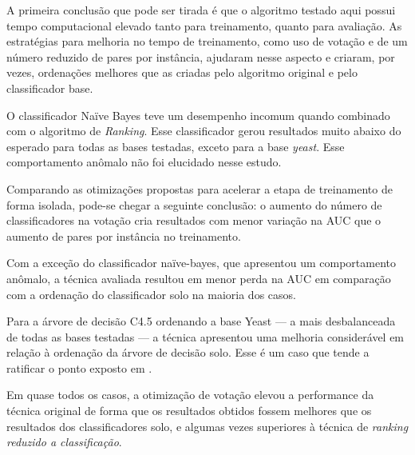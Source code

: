A primeira conclusão que pode ser tirada é que o algoritmo testado aqui possui tempo computacional elevado tanto para treinamento, quanto para avaliação. As estratégias para melhoria no tempo de treinamento, como uso de votação e de um número reduzido de pares por instância, ajudaram nesse aspecto e criaram, por vezes, ordenações melhores que as criadas pelo algoritmo original e pelo classificador base.

O classificador Naïve Bayes teve um desempenho incomum quando combinado com o algoritmo de \emph{Ranking}. Esse classificador gerou resultados muito abaixo do esperado para todas as bases testadas, exceto para a base \emph{yeast}. Esse comportamento anômalo não foi elucidado nesse estudo.

Comparando as otimizações propostas para acelerar a etapa de treinamento de forma isolada, pode-se chegar a seguinte conclusão: o aumento do número de classificadores na votação cria resultados com menor variação na AUC que o aumento de pares por instância no treinamento.

Com a exceção do classificador naïve-bayes, que apresentou um comportamento anômalo, a técnica avaliada resultou em menor perda na AUC em comparação com a ordenação do classificador solo na maioria dos casos.

Para a árvore de decisão C4.5 ordenando a base Yeast --- a mais desbalanceada de todas as bases testadas --- a técnica apresentou uma melhoria considerável em relação à ordenação da árvore de decisão solo. Esse é um caso que tende a ratificar o ponto exposto em \cite{langford08}.

Em quase todos os casos, a otimização de votação elevou a performance da técnica original de forma que os resultados obtidos fossem melhores que os resultados dos classificadores solo, e algumas vezes superiores à técnica de \emph{ranking reduzido a classificação}.